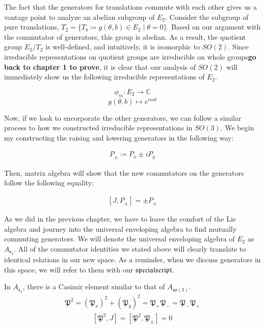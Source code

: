 \documentclass[10pt]{ucthesis}
\newcommand{\C}{\mathbb{C}}
\begin{document}
The fact that the generators for translations commute with each other gives us a vantage point to analyze an abelian subgroup of $E_2$. Consider the subgroup of pure translations, $T_2 = \{ T_b \coloneq g(\theta,b)\in E_2 \mid \theta=0\}$. Based on our argument with the commutator of generators, this group is abelian. As a result, the quotient group $E_2/T_2$ is well-defined, and intuitively, it is isomorphic to $SO(2)$. Since irreducible representations on quotient groups are irreducible on whole groups\textbf{go back to chapter 1 to prove}, it is clear that our analysis of $SO(2)$ will immediately show us the following irreducible representations of $E_2$.

$$\phi_m:E_2\rightarrow \C$$
$$g(\theta,b)\mapsto e^{im\theta}$$

Now, if we look to encorporate the other generators, we can follow a similar process to how we constructed irreducible representations in $SO(3)$. We begin my constructing the raising and lowering generators in the following way:

\begin{equation}
\begin{aligned}
	P_\pm \coloneq P_x \pm iP_y
\end{aligned}
\end{equation}

 Then, matrix algebra will show that the new commutators on the generators follow the following equality:

\begin{equation}
\begin{aligned}
	[J,P_\pm] = \pm P_\pm 
\end{aligned}
\end{equation}

As we did in the previous chapter, we have to leave the comfort of the Lie algebra and journey into the universal enveloping algebra to find mutually commuting generators. We will denote the universal enveloping algebra of $E_2$ as $A_{\mathfrak{e_2}}$. All of the commutator identities we stated above will clearly translate to identical relations in our new space. As a reminder, when we discuss generators in this space, we will refer to them with our $\mathfrak{special script}$. 

In $A_{\mathfrak{e_2}}$, there is a Casimir element similar to that of $A_\mathfrak{so(3)}$. 
\begin{equation}
\begin{aligned}
	\mathfrak{P}^2 = (\mathfrak{P}_x)^2 + (\mathfrak{P}_y)^2 = \mathfrak{P}_+\mathfrak{P}_- = \mathfrak{P}_-\mathfrak{P}_+
\end{aligned}
\end{equation}
\begin{equation}
\begin{aligned}
	[\mathfrak{P}^2,J] =[\mathfrak{P}^2,\mathfrak{P}_\pm]  = 0
\end{aligned}
\end{equation}
\end{document}
